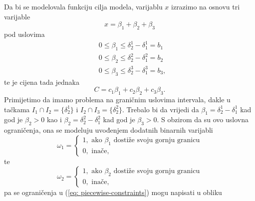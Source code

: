 \documentclass[a4paper, utf8, 11pt, colorlinks]{book}
\begin{document}
Da bi se modelovala funkciju cilja modela, varijablu $x$ izrazimo na osnovu tri varijable 
$$x = \beta_1 + \beta_2 + \beta_3$$
pod uslovima 
\begin{align}
     &0   \leq \beta_1 \leq \delta^1_2 - \delta^1_1 = b_1 \nonumber \\
     &0  \leq \beta_2 \leq \delta^2_2 - \delta^2_1 = b_2 \nonumber \\
     &0  \leq \beta_3 \leq \delta^3_2- \delta^3_1 = b_3, \label{eq: piecewise-constraints}
\end{align}
te je cijena tada jednaka 
$$ C = c_1 \beta_1 + c_2 \beta_2 + c_3 \beta_3.$$ 
Primijetimo da imamo problema na graničnim uslovima intervala, dakle u tačkama $I_1 \cap I_2 =\{\delta^1_2\}$ i $I_2 \cap I_3 =\{\delta^2_2\}$. Trebalo bi da vrijedi da $\beta_1 =  \delta^1_2 - \delta^1_1$ kad god je $\beta_2  > 0$ kao i $\beta_2 =  \delta^2_2 - \delta^2_1$ kad god je $\beta_3  > 0$.  S obzirom da su ovo uslovna ograničenja, ona se modeluju uvođenjem dodatnih binarnih varijabli 
$$ \omega_1 = \begin{cases}
                   1, \mbox{ ako } \beta_1 \mbox{ dostiže svoju gornju granicu} \\
                   0, \mbox{ inače},
              \end{cases}$$
te 
$$ \omega_2 = \begin{cases}
                   1, \mbox{ ako } \beta_2 \mbox{ dostiže svoju gornju granicu} \\
                   0, \mbox{ inače}, 
              \end{cases}$$
pa se ograničenja u (\ref{eq: piecewise-constraints}) mogu napisati u obliku
\end{document}

